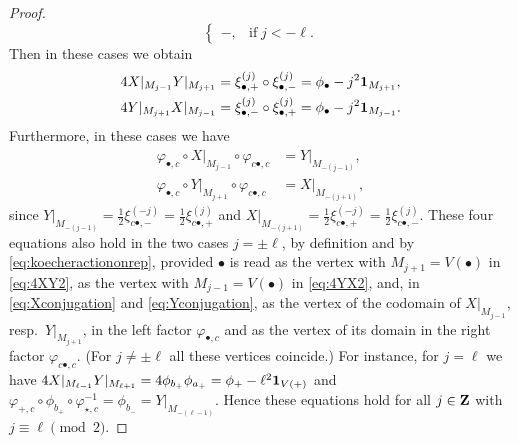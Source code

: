 \documentclass[a4paper,12pt,reqno]{amsart}
\newcommand{\ZZ}{{\rm\bf Z}}
\theoremstyle{plain}
\theoremstyle{remark}
\begin{document}
\begin{proof}
\[\begin{cases}
      -,&\text{if}\;j<-\ell.
    \end{cases}
    \]
    Then in these cases we obtain
    \begin{align}
      4X|_{M_{j-1}}Y|_{M_{j+1}}&=\xi_{\bullet,+}^{(j)}\circ\xi_{\bullet,-}^{(j)}=\phi_\bullet-j^2{\bf1}_{M_{j+1}},\label{eq:4XY2}\\
      4Y|_{M_{j+1}}X|_{M_{j-1}}&=\xi_{\bullet,-}^{(j)}\circ\xi_{\bullet,+}^{(j)}=\phi_\bullet-j^2{\bf1}_{M_{j-1}}.\label{eq:4YX2}
    \end{align}
    Furthermore, in these cases we have
    \begin{align}
      \varphi_{\bullet,c}\circ
      X|_{M_{j-1}}
      \circ\varphi_{c\bullet,c}
      &=Y|_{M_{-(j-1)}},\label{eq:Xconjugation}\\
      \varphi_{\bullet,c}\circ
      Y|_{M_{j+1}}
      \circ\varphi_{c\bullet,c}
      &=X|_{M_{-(j+1)}},\label{eq:Yconjugation}
    \end{align}
    since $Y|_{M_{-(j-1)}}=\frac{1}{2}\xi_{c\bullet,-}^{(-j)}=\frac{1}{2}\xi_{c\bullet,+}^{(j)}$ and $X|_{M_{-(j+1)}}=\frac{1}{2}\xi_{c\bullet,+}^{(-j)}=\frac{1}{2}\xi_{c\bullet,-}^{(j)}$. These four equations also hold in the two cases $j=\pm\ell$, by definition and by \eqref{eq:koecheractiononrep}, provided $\bullet$ is read as the vertex with $M_{j+1}=V(\bullet)$ in \eqref{eq:4XY2}, as the vertex with $M_{j-1}=V(\bullet)$ in \eqref{eq:4YX2}, and, in \eqref{eq:Xconjugation} and \eqref{eq:Yconjugation}, as the vertex of the codomain of $X|_{M_{j-1}}$, resp.\ $Y|_{M_{j+1}}$, in the left factor $\varphi_{\bullet,c}$ and as the vertex of its domain in the right factor $\varphi_{c\bullet,c}$. (For $j\neq\pm\ell$ all these vertices coincide.) For instance, for $j=\ell$ we have $4X|_{M_{\ell-1}}Y|_{M_{\ell+1}}=4\phi_{b_+}\phi_{a_+}=\phi_+-\ell^2{\bf1}_{V(+)}$ and $\varphi_{+,c}\circ\phi_{b_+}\circ\varphi_{\star,c}^{-1}=\phi_{b_-}=Y|_{M_{-(\ell-1)}}$. Hence these equations hold for all $j\in\ZZ$ with $j\equiv\ell\pmod{2}$.
      

\end{proof}
\end{document}
